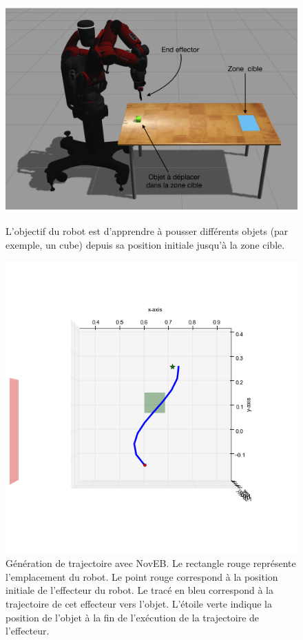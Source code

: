 \documentclass{llncs}
\begin{document}
\begin{figure}[!tbp]
  \centering
  \begin{minipage}[b]{0.4\textwidth}
    \includegraphics[width=\textwidth]{figures/Experiment_setup_annoted_FR.png}
    \caption{L'objectif du robot est d'apprendre à pousser différents objets (par exemple, un cube) depuis sa position initiale jusqu'à la zone cible.}
    \label{fig:setup}
  \end{minipage}
  \hfill
  \begin{minipage}[b]{0.4\textwidth}
    \includegraphics[width=\textwidth]{figures/ns_trajectory.png}
    \caption{Génération de trajectoire avec NovEB. Le rectangle rouge représente l'emplacement du robot. Le point rouge correspond à la position initiale de l'effecteur du robot. Le tracé en bleu correspond à la trajectoire de cet effecteur vers l'objet. L'étoile verte indique la position de l'objet à la fin de l'exécution de la trajectoire de l'effecteur.}
    \label{fig:ns_traj}
  \end{minipage}
\end{figure}
\end{document}
